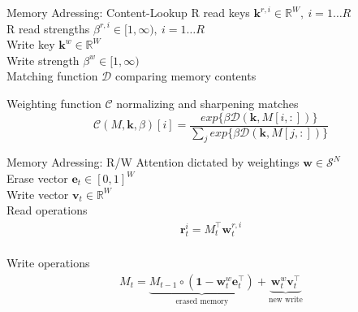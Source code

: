 \documentclass{beamer}
\begin{document}
\begin{frame}{Memory Adressing: Content-Lookup}
	\alert{R read keys} $\pmb{k}^{r,i} \in \mathbb{R}^W,\ i=1\dots R$\\
	\alert{R read strengths} $\beta^{r,i} \in [1,\infty),\ i=1\dots R$\\
	\alert{Write key} $\pmb{k}^{w} \in \mathbb{R}^W$\\
	\alert{Write strength} $\beta^{w} \in [1,\infty)$\\
	
	\pause
	\alert{Matching function} $\mathcal{D}$ comparing memory contents
	
	\pause
	\alert{Weighting function} $\mathcal{C}$ normalizing and sharpening matches
	\[
	\mathcal{C}(M,\pmb{k},\beta)[i]= 
	\frac {exp \{\beta\mathcal{D} (\pmb{k},M[i,:])\} }
	{ \sum_{j}{exp \{\beta\mathcal{D} (\pmb{k},M[j,:]) \}}}
	\]
\end{frame}

\begin{frame}{Memory Adressing: R/W}
	\alert{Attention} dictated by weightings $\pmb{w} \in \mathcal{S}^N$\\
	\alert{Erase vector} $\pmb{e}_t \in [0,1]^W$\\
	\alert{Write vector} $\pmb{v}_t \in \mathbb{R}^W$\\

	\alert{Read operations}
	\begin{align*}
	 \pmb{r}_t^i = M_t^\top\pmb{w}_t^{r,i}\\
	\end{align*}
	
	\pause
	\alert{Write operations}
	\begin{align*}
	M_t = \underbrace{M_{t-1} \circ (\pmb{1} - \pmb{w}_t^w\pmb{e}_t^\top)}_{\text{erased memory}} + 
	\underbrace{\pmb{w}_t^w\pmb{v}_t^\top}_{\text{new write}}
	\end{align*}
\end{frame}
\end{document}

